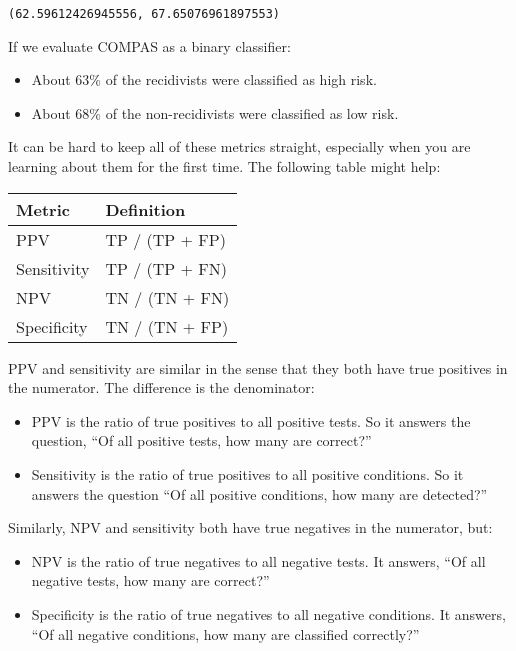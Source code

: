 \begin{lstlisting}[style=output]
(62.59612426945556, 67.65076961897553)
\end{lstlisting}

\pagebreak

If we evaluate COMPAS as a binary classifier:

\begin{itemize}
\item
  About 63\% of the recidivists were classified as high risk.
\item
  About 68\% of the non-recidivists were classified as low risk.
\end{itemize}

It can be hard to keep all of these metrics straight, especially when
you are learning about them for the first time. The following table
might help:

\begin{longtable}[]{ll}
\toprule
Metric & Definition \\
\midrule
\endhead
\bottomrule
\endlastfoot
PPV & TP / (TP + FP) \\
Sensitivity & TP / (TP + FN) \\
NPV & TN / (TN + FN) \\
Specificity & TN / (TN + FP) \\
\end{longtable}

PPV and sensitivity are similar in the sense that they both have true
positives in the numerator. The difference is the denominator:

\begin{itemize}
\item
  PPV is the ratio of true positives to all positive tests. So it
  answers the question, ``Of all positive tests, how many are correct?''
\item
  Sensitivity is the ratio of true positives to all positive conditions.
  So it answers the question ``Of all positive conditions, how many are
  detected?''
\end{itemize}

Similarly, NPV and sensitivity both have true negatives in the
numerator, but:

\begin{itemize}
\item
  NPV is the ratio of true negatives to all negative tests. It answers,
  ``Of all negative tests, how many are correct?''
\item
  Specificity is the ratio of true negatives to all negative conditions.
  It answers, ``Of all negative conditions, how many are classified
  correctly?''
\end{itemize}

